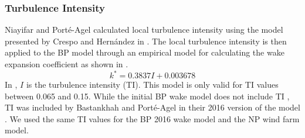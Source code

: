 \documentclass[conf]{new-aiaa}
\begin{document}
\subsubsection{Turbulence Intensity}\label{sec:ti}
Niayifar and Port\'{e}-Agel calculated local turbulence intensity using the model presented by Crespo and Hern\'{a}ndez in \cite{crespo1996}. The local turbulence intensity is then applied to the BP model through an empirical model for calculating the wake expansion coefficient as shown in  \cite{niayifar2016}.
 \begin{equation} \label{eq:ti_npa}
 	k^* = 0.3837 I + 0.003678
 \end{equation}
%
In , $I$ is the turbulence intensity (TI). This model is only valid for TI values between 0.065 and 0.15. While the initial BP wake model does not include TI \cite{bastankhah2014}, TI was included by Bastankhah and Port\'{e}-Agel in their 2016 version of the model \cite{bastankhah2016}. We used the same TI values for the BP 2016 wake model and the NP wind farm model. 
\end{document}
